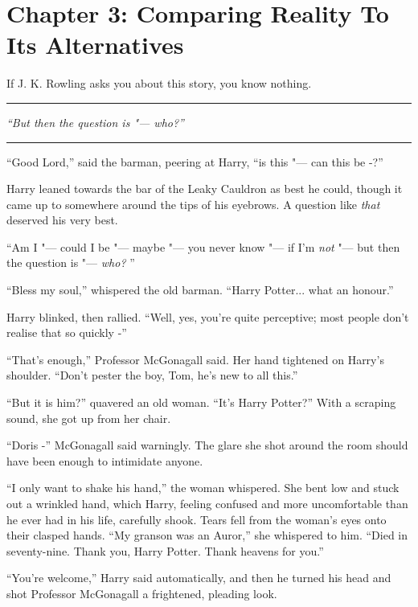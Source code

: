 \chapter{Chapter 3: Comparing Reality To Its Alternatives}
If J. K. Rowling asks you about this story, you know nothing.

\begin{center}\rule{3in}{0.4pt}\end{center}

\emph{``But then the question is "--- who?''}

\begin{center}\rule{3in}{0.4pt}\end{center}

``Good Lord,'' said the barman, peering at Harry, ``is this "--- can this
be -?''

Harry leaned towards the bar of the Leaky Cauldron as best he could,
though it came up to somewhere around the tips of his eyebrows. A
question like \emph{that} deserved his very best.

``Am I "--- could I be "--- maybe "--- you never know "--- if I'm \emph{not} "--- but
then the question is "--- \emph{who?} ''

``Bless my soul,'' whispered the old barman. ``Harry Potter... what
an honour.''

Harry blinked, then rallied. ``Well, yes, you're quite perceptive; most
people don't realise that so quickly -''

``That's enough,'' Professor McGonagall said. Her hand tightened on
Harry's shoulder. ``Don't pester the boy, Tom, he's new to all this.''

``But it is him?'' quavered an old woman. ``It's Harry Potter?'' With a
scraping sound, she got up from her chair.

``Doris -'' McGonagall said warningly. The glare she shot around the
room should have been enough to intimidate anyone.

``I only want to shake his hand,'' the woman whispered. She bent low and
stuck out a wrinkled hand, which Harry, feeling confused and more
uncomfortable than he ever had in his life, carefully shook. Tears fell
from the woman's eyes onto their clasped hands. ``My granson was an
Auror,'' she whispered to him. ``Died in seventy-nine. Thank you, Harry
Potter. Thank heavens for you.''

``You're welcome,'' Harry said automatically, and then he turned his
head and shot Professor McGonagall a frightened, pleading look.

